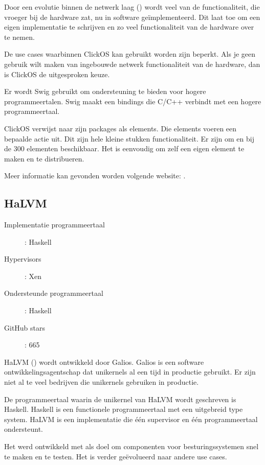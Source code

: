 Door een evolutie binnen de netwerk laag (\cite{garcia_villalba_trends_2015}) wordt veel van de functionaliteit, die vroeger bij de hardware zat, nu in software geïmplementeerd. Dit laat toe om een eigen implementatie te schrijven en zo veel functionaliteit van de hardware over te nemen.

De use cases waarbinnen ClickOS kan gebruikt worden zijn beperkt. Als je geen gebruik wilt maken van ingebouwde netwerk functionaliteit van de hardware, dan is ClickOS de uitgesproken keuze.

Er wordt Swig gebruikt om ondersteuning te bieden voor hogere programmeertalen. Swig maakt een bindings die C/C++ verbindt met een hogere programmeertaal.

ClickOS verwijst naar zijn packages als elements. Die elements voeren een bepaalde actie uit. Dit zijn hele kleine stukken functionaliteit. Er zijn om en bij de 300 elementen beschikbaar. Het is eenvoudig om zelf een eigen element te maken en te distribueren.

Meer informatie kan gevonden worden volgende website: \cite{cloud_networking_performance_lab_cloud_????}.

\subsection{HaLVM}

\begin{description}
  \item [Implementatie programmeertaal]: Haskell
  \item [Hypervisors]: Xen
  \item [Ondersteunde programmeertaal]: Haskell
  \item [GitHub stars]: 665
\end{description}

HaLVM (\cite{galois_inc._haskell_????}) wordt ontwikkeld door Galios. Galios is een software ontwikkelingsagentschap dat unikernels al een tijd in productie gebruikt.
Er zijn niet al te veel bedrijven die unikernels gebruiken in productie.

De programmeertaal waarin de unikernel van HaLVM wordt geschreven is Haskell. Haskell is een functionele programmeertaal met een uitgebreid type system. HaLVM is een implementatie die één supervisor en één programmeertaal ondersteunt.

Het werd ontwikkeld met als doel om componenten voor besturingssystemen snel te maken en te testen. Het is verder geëvolueerd naar andere use cases.

